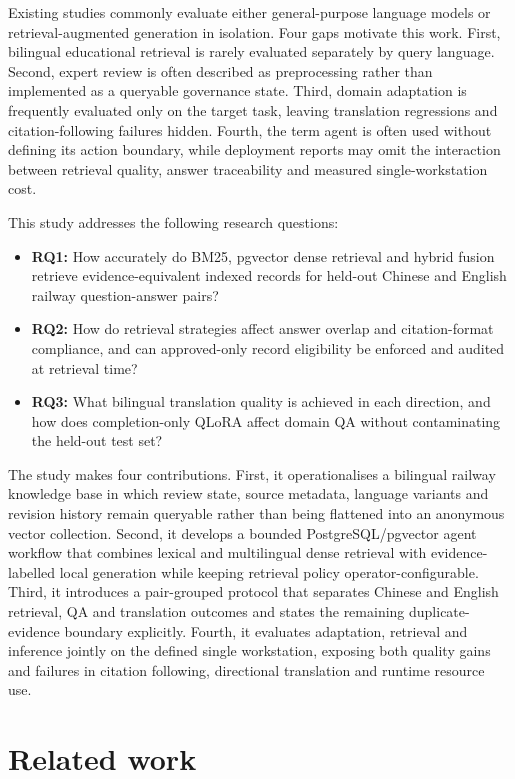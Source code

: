 Existing studies commonly evaluate either general-purpose language models or retrieval-augmented generation in isolation. Four gaps motivate this work. First, bilingual educational retrieval is rarely evaluated separately by query language. Second, expert review is often described as preprocessing rather than implemented as a queryable governance state. Third, domain adaptation is frequently evaluated only on the target task, leaving translation regressions and citation-following failures hidden. Fourth, the term agent is often used without defining its action boundary, while deployment reports may omit the interaction between retrieval quality, answer traceability and measured single-workstation cost.

This study addresses the following research questions:

\begin{itemize}
\item \textbf{RQ1:} How accurately do BM25, pgvector dense retrieval and hybrid fusion retrieve evidence-equivalent indexed records for held-out Chinese and English railway question-answer pairs?
\item \textbf{RQ2:} How do retrieval strategies affect answer overlap and citation-format compliance, and can approved-only record eligibility be enforced and audited at retrieval time?
\item \textbf{RQ3:} What bilingual translation quality is achieved in each direction, and how does completion-only QLoRA affect domain QA without contaminating the held-out test set?
\end{itemize}

The study makes four contributions. First, it operationalises a bilingual railway knowledge base in which review state, source metadata, language variants and revision history remain queryable rather than being flattened into an anonymous vector collection. Second, it develops a bounded PostgreSQL/pgvector agent workflow that combines lexical and multilingual dense retrieval with evidence-labelled local generation while keeping retrieval policy operator-configurable. Third, it introduces a pair-grouped protocol that separates Chinese and English retrieval, QA and translation outcomes and states the remaining duplicate-evidence boundary explicitly. Fourth, it evaluates adaptation, retrieval and inference jointly on the defined single workstation, exposing both quality gains and failures in citation following, directional translation and runtime resource use.

\section{Related work}

